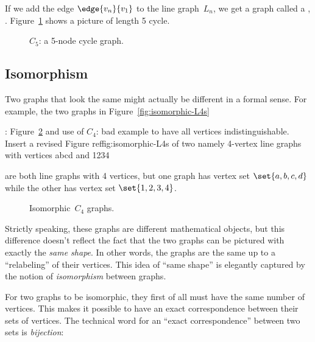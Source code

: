 If we add the edge $\edge{v_n}{v_1}$ to the line graph~$L_n$, we get a
graph called a , .
Figure~\ref{fig:graph_C_5} shows a picture of length 5 cycle.

\begin{figure}


\caption{$C_5$: a 5-node cycle graph.}
\label{fig:graph_C_5}
\end{figure}

\subsection{Isomorphism}

Two graphs that look the same might actually be different in a formal
sense.  For example, the two graphs in Figure~\ref{fig:isomorphic-L4s}
\begin{editingnotes}
: Figure~\ref{fig:isomorphism} and use of
  $C_4$: bad example to have all vertices indistinguishable.  Insert a
  revised Figure ref{fig:isomorphic-L4s} of two namely 4-vertex
  line graphs with vertices abcd and 1234
\end{editingnotes}
 are both line graphs with 4
  vertices, but one graph has vertex set $\set{a,
    b, c, d}$ while the other has vertex set $\set{1, 2, 3, 4}$.
\begin{figure}

\qquad
{}

\caption{Isomorphic~$C_4$ graphs.}
\label{fig:isomorphism}
\end{figure}

\begin{editingnotes}
\end{editingnotes} Strictly speaking, these graphs are different mathematical
objects, but this difference doesn't reflect the fact that the two graphs
can be pictured with exactly the \emph{same shape}.  In other words, the
graphs are the same up to a ``relabeling'' of their vertices.  This idea
of ``same shape'' is elegantly captured by the notion of
\emph{isomorphism} between graphs.

For two graphs to be isomorphic, they first of all must have the same
number of vertices.  This makes it possible to have an exact
correspondence between their sets of vertices.  The technical word for an
``exact correspondence'' between two sets is \emph{bijection}:

